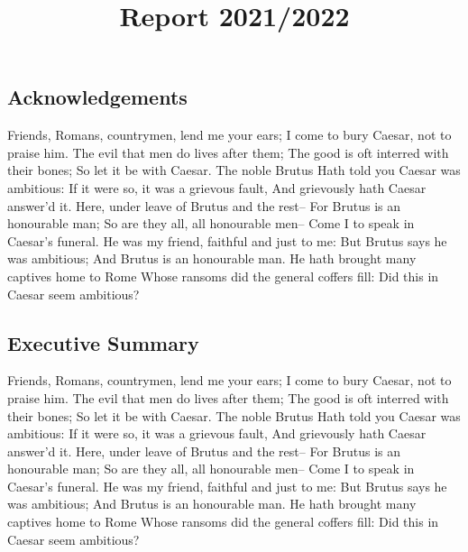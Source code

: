 \documentclass[
  letterpaper,
  DIV=11,
  numbers=noendperiod]{scrartcl}
\title{Report 2021/2022}
\author{}
\date{}
\renewcommand*\contentsname{Table of contents}
\newcommand\contentsname{Table of contents}
\begin{document}
\maketitle
\ifdefined\Shaded\renewenvironment{Shaded}{\begin{tcolorbox}[borderline west={3pt}{0pt}{shadecolor}, boxrule=0pt, sharp corners, frame hidden, breakable, interior hidden, enhanced]}{\end{tcolorbox}}\fi

\renewcommand*\contentsname{Table of contents}
{
\hypersetup{linkcolor=}
\setcounter{tocdepth}{2}
\tableofcontents
}
\hypertarget{acknowledgements}{%
\subsection{Acknowledgements}\label{acknowledgements}}

Friends, Romans, countrymen, lend me your ears; I come to bury Caesar,
not to praise him. The evil that men do lives after them; The good is
oft interred with their bones; So let it be with Caesar. The noble
Brutus Hath told you Caesar was ambitious: If it were so, it was a
grievous fault, And grievously hath Caesar answer'd it. Here, under
leave of Brutus and the rest-- For Brutus is an honourable man; So are
they all, all honourable men-- Come I to speak in Caesar's funeral. He
was my friend, faithful and just to me: But Brutus says he was
ambitious; And Brutus is an honourable man. He hath brought many
captives home to Rome Whose ransoms did the general coffers fill: Did
this in Caesar seem ambitious?

\hypertarget{executive-summary}{%
\subsection{Executive Summary}\label{executive-summary}}

Friends, Romans, countrymen, lend me your ears; I come to bury Caesar,
not to praise him. The evil that men do lives after them; The good is
oft interred with their bones; So let it be with Caesar. The noble
Brutus Hath told you Caesar was ambitious: If it were so, it was a
grievous fault, And grievously hath Caesar answer'd it. Here, under
leave of Brutus and the rest-- For Brutus is an honourable man; So are
they all, all honourable men-- Come I to speak in Caesar's funeral. He
was my friend, faithful and just to me: But Brutus says he was
ambitious; And Brutus is an honourable man. He hath brought many
captives home to Rome Whose ransoms did the general coffers fill: Did
this in Caesar seem ambitious?
\end{document}
